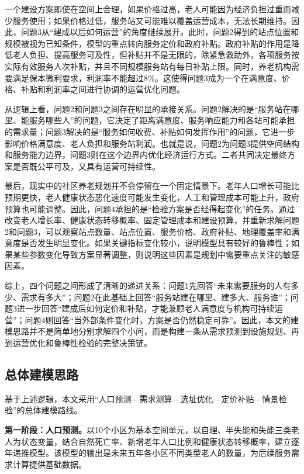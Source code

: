 \documentclass[UTF8]{ctexart}
\begin{document}
一个建设方案即使在空间上合理，如果价格过高，老人可能因为经济负担过重而减少服务使用；如果价格过低，服务站又可能难以覆盖运营成本，无法长期维持。因此，问题3从“建成以后如何运营”的角度继续展开。此时，问题2得到的站点位置和规模被视为已知条件，模型的重点转向服务定价和政府补贴。政府补贴的作用是降低老人负担、提高服务可及性，但补贴并不是无限的，除紧急救助外，各项服务按实际有效服务人次补贴，并且不同规模服务站有每日补贴上限。同时，养老机构需要满足保本微利要求，利润率不能超过8\%。这使得问题3成为一个在满意度、价格、补贴和利润率之间进行协调的运营优化问题。

从逻辑上看，问题2和问题3之间存在明显的承接关系。问题2解决的是“服务站在哪里、能服务哪些人”的问题，它决定了距离满意度、服务响应能力和各站可能承担的需求量；问题3解决的是“服务如何收费、补贴如何发挥作用”的问题，它进一步影响价格满意度、老人负担和服务站利润。也就是说，问题2为问题3提供空间结构和服务能力边界，问题3则在这个边界内优化经济运行方式。二者共同决定最终方案是否既公平可及，又具有运营可持续性。

最后，现实中的社区养老规划并不会停留在一个固定情景下。老年人口增长可能比预期更快，老人健康状态恶化速度可能发生变化，人工和管理成本可能上升，政府预算也可能调整。因此，问题4承担的是“检验方案是否经得起变化”的任务。通过改变老人增长率、健康状态转移概率、固定管理成本和建设预算，并重新求解问题2和问题3，可以观察站点数量、站点位置、服务价格、政府补贴、地理覆盖率和满意度是否发生明显变化。如果关键指标变化较小，说明模型具有较好的鲁棒性；如果某些参数变化导致方案显著调整，则说明这些因素是规划中需要重点关注的敏感因素。

综上，四个问题之间形成了清晰的递进关系：问题1先回答“未来需要服务的人有多少、需求有多大”；问题2在此基础上回答“服务站建在哪里、建多大、服务谁”；问题3进一步回答“建成后如何定价和补贴，才能兼顾老人满意度与机构可持续运营”；问题4则回答“当外部条件变化时，方案是否仍然稳定可靠”。因此，本文的建模思路并不是简单地分别求解四个小问，而是构建一条从需求预测到设施规划、再到运营优化和鲁棒性检验的完整决策链。

\subsection{总体建模思路}

基于上述逻辑，本文采用“人口预测—需求测算—选址优化—定价补贴—情景检验”的总体建模路线。

\textbf{第一阶段：人口预测。}以10个小区为基本空间单元，以自理、半失能和失能三类老人为状态变量，结合自然死亡率、新增老年人口比例和健康状态转移概率，建立逐年递推模型。该模型的输出是未来五年各小区不同类型老人的数量，为后续服务需求计算提供基础数据。
\end{document}

